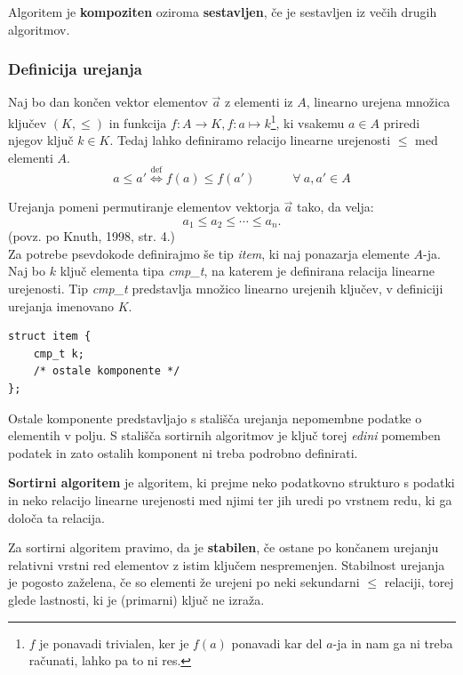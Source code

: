 \documentclass[a4paper,oneside,12pt]{article}
\begin{document}
\begin{definicija}
  Algoritem je \textbf{kompoziten} oziroma \textbf{sestavljen}, če je sestavljen iz večih
  drugih algoritmov.
\end{definicija}

\subsubsection{Definicija urejanja}
\label{chapter:sortdef}
Naj bo dan končen vektor elementov $\vec{a}$ z elementi iz $A$, linearno urejena množica ključev $(K,
\leq)$ in funkcija $f\!\!: A \rightarrow K, f\!\!: a \mapsto k$\footnote{
$f$ je ponavadi trivialen, ker je $f(a)$ ponavadi kar del
$a$-ja in nam ga ni treba računati, lahko pa to ni res.}, ki vsakemu $a \in A$ priredi
njegov ključ $k \in K$.
Tedaj lahko definiramo relacijo linearne urejenosti $\leq$ med elementi $A$.
\[ a \leq a' \overset{\text{def}}{\Longleftrightarrow} f(a) \leq f(a') \hspace{3em} \forall\ a, a' \in A \]

Urejanja pomeni permutiranje elementov vektorja $\vec{a}$ tako, da velja:
\[ a_1 \leq a_2 \leq \cdots \leq a_n.\]
(povz. po Knuth, 1998, str. 4.) \\

Za potrebe psevdokode definirajmo še tip \emph{item}, ki naj ponazarja elemente
\mbox{$A$-ja}.
Naj bo $k$ ključ elementa tipa \emph{cmp\_\!t}, na katerem je definirana relacija
linearne urejenosti. Tip \emph{cmp\_\!t} predstavlja množico linearno urejenih ključev,
v definiciji urejanja imenovano $K$.

\begin{lstlisting}
struct item {
    cmp_t k;
    /* ostale komponente */
};
\end{lstlisting}

Ostale komponente predstavljajo s stališča urejanja nepomembne podatke o elementih v
polju.
S stališča sortirnih algoritmov je ključ torej \emph{edini} pomemben podatek in zato
ostalih komponent ni treba podrobno definirati.

\begin{definicija}
  \textbf{Sortirni algoritem} je algoritem, ki prejme neko podatkovno strukturo s podatki
  in neko relacijo linearne urejenosti med njimi ter jih uredi po vrstnem redu, ki ga določa ta
  relacija.
\end{definicija}

\begin{definicija}
  Za sortirni algoritem pravimo, da je \textbf{stabilen}, če ostane po končanem urejanju
  relativni vrstni red elementov z istim ključem nespremenjen.
  Stabilnost urejanja je pogosto zaželena, če so elementi že urejeni po neki
  sekundarni $\leq$ relaciji, torej glede lastnosti, ki je (primarni) ključ ne izraža.
\end{definicija}
\end{document}
